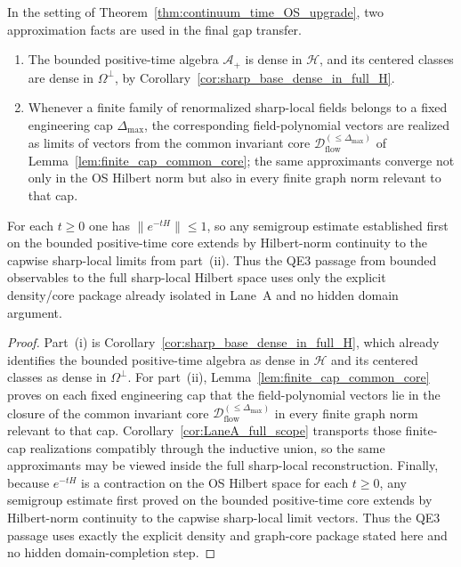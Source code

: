 \begin{lemma}\label{lem:QE3_core_topology}
In the setting of Theorem~\ref{thm:continuum_time_OS_upgrade}, two approximation facts are used in the final gap transfer.
\begin{enumerate}[label=(\roman*),leftmargin=*]
\item The bounded positive-time algebra $\mathcal A_+$ is dense in $\mathcal H$, and its centered classes are dense in $\Omega^\perp$, by Corollary~\ref{cor:sharp_base_dense_in_full_H}.
\item Whenever a finite family of renormalized sharp-local fields belongs to a fixed engineering cap $\Delta_{\max}$, the corresponding field-polynomial vectors are realized as limits of vectors from the common invariant core $\mathcal D_{\mathrm{flow}}^{(\le \Delta_{\max})}$ of Lemma~\ref{lem:finite_cap_common_core}; the same approximants converge not only in the OS Hilbert norm but also in every finite graph norm relevant to that cap.
\end{enumerate}
For each $t\ge 0$ one has $\|e^{-tH}\|\le 1$, so any semigroup estimate established first on the bounded positive-time core extends by Hilbert-norm continuity to the capwise sharp-local limits from part~(ii).
Thus the QE3 passage from bounded observables to the full sharp-local Hilbert space uses only the explicit density/core package already isolated in Lane~A and no hidden domain argument.
\end{lemma}

\begin{proof}
Part~(i) is Corollary~\ref{cor:sharp_base_dense_in_full_H}, which already identifies the bounded positive-time algebra as dense in $\mathcal H$ and its centered classes as dense in $\Omega^\perp$.
For part~(ii), Lemma~\ref{lem:finite_cap_common_core} proves on each fixed engineering cap that the field-polynomial vectors lie in the closure of the common invariant core $\mathcal D_{\mathrm{flow}}^{(\le \Delta_{\max})}$ in every finite graph norm relevant to that cap. Corollary~\ref{cor:LaneA_full_scope} transports those finite-cap realizations compatibly through the inductive union, so the same approximants may be viewed inside the full sharp-local reconstruction. Finally, because $e^{-tH}$ is a contraction on the OS Hilbert space for each $t\ge 0$, any semigroup estimate first proved on the bounded positive-time core extends by Hilbert-norm continuity to the capwise sharp-local limit vectors. Thus the QE3 passage uses exactly the explicit density and graph-core package stated here and no hidden domain-completion step.
\end{proof}

